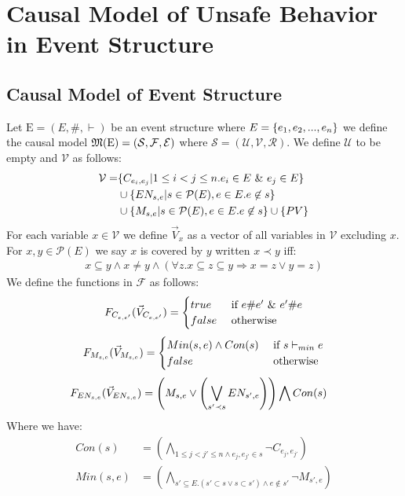 \section{Causal Model of Unsafe Behavior in Event Structure}

\subsection{Causal Model of Event Structure}
Let $\mathrm{E} = (E,\#,\vdash)$ be an event structure where
$E = \{e_1, e_2, ...,e_n\}$ we define the causal model
$\mathfrak{M}(\mathrm{E}) = (\mathcal{S},\mathcal{F},\mathcal{E})$
where
$\mathcal{S} = (\mathcal{U},\mathcal{V},\mathcal{R})$.
We define $\mathcal{U}$ to be empty and $\mathcal{V}$ as follows:
\begin{align*}
    \mathcal{V} = & \{C_{e_i,e_j} |  1 \leq i < j \leq n.
    e_i \in E \ \& \  e_j \in E\}                                \\
                  & \cup \{EN_{s,e} | s \in \mathcal{P}(E),
    e \in E. e \not \in s \}                                  \\
                  & \cup \{M_{s,e} | s \in \mathcal{P}(E),
        e \in E. e \not \in s \} \cup \{PV\}
\end{align*}
For each variable $x \in \mathcal{V}$ we define $\vec V_x$ as a vector
of all variables in $\mathcal{V}$ excluding $x$.
For $x,y \in \mathcal{P}(E)$ we say $x$ is covered by $y$ written $ x \prec y$ iff:
\begin{align*}
    x \subseteq y \wedge x \neq y \wedge
    (\forall z. x \subseteq z \subseteq y \Rightarrow x = z
    \vee y = z)
\end{align*}
We define the functions in $\mathcal{F}$ as follows:
$$
    F_{C_{e,e'}}(\vec V_{C_{e,e'}}) = \begin{cases}
        true  & \text{ if } e \# e' \ \& \  e' \# e \\
        false & \text{ otherwise }
    \end{cases}
$$
$$
    F_{M_{s,e}}(\vec V_{M_{s,e}}) = \begin{cases}
        Min(s,e) \wedge Con(s) & \text{ if } s \vdash_{min} e \\
        false                  & \text{ otherwise }
    \end{cases}
$$
\begin{align*}
    F_{EN_{s,e}}(\vec V_{EN_{s,e}}) & =
    \left(
    M_{s,e} \vee
    \left(
    \bigvee_{s'\prec s}EN_{s',e}
    \right)
    \right)
    \bigwedge
    Con(s)
\end{align*}
Where we have:
\begin{align*}
    Con(s)   & =   \left(
    \bigwedge_{ 1\leq j<j' \leq n \wedge e_j,e_{j'} \in s}
    \neg C_{e_j,e_{j'}}
    \right)               \\
    Min(s,e) & = \left(
    \bigwedge_{s' \subseteq E. (s' \subset s \vee s \subset s')
        \wedge e \notin s'}
    \neg M_{s',e}
    \right)
\end{align*}
